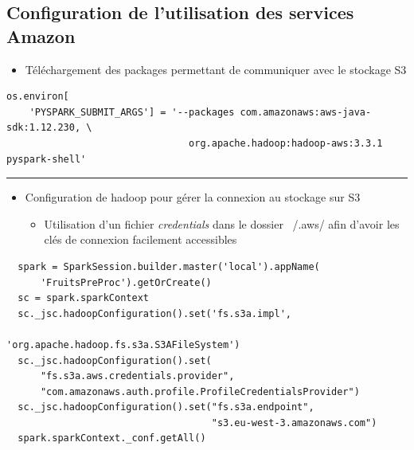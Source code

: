 \documentclass[8pt,aspectratio=169,hyperref={unicode=true}]{beamer}
\begin{document}
\subsection{Configuration de l'utilisation des services Amazon}
\begin{frame}[fragile]{\insertsection}{\insertsubsection}
  \begin{itemize}
    \item Téléchargement des packages permettant de communiquer avec le stockage S3
  \end{itemize}
  \begin{verbatim}
os.environ[
    'PYSPARK_SUBMIT_ARGS'] = '--packages com.amazonaws:aws-java-sdk:1.12.230, \
                                org.apache.hadoop:hadoop-aws:3.3.1 pyspark-shell'
  \end{verbatim}

  \vfill
  \hrule

  \begin{itemize}
    \item Configuration de hadoop pour gérer la connexion au stockage sur S3
    \begin{itemize}
      \item Utilisation d'un fichier \emph{credentials} dans le dossier ~/.aws/ afin d'avoir les clés de connexion facilement accessibles
    \end{itemize}
  \end{itemize}
  \begin{verbatim}
  spark = SparkSession.builder.master('local').appName(
      'FruitsPreProc').getOrCreate()
  sc = spark.sparkContext
  sc._jsc.hadoopConfiguration().set('fs.s3a.impl',
                                    'org.apache.hadoop.fs.s3a.S3AFileSystem')
  sc._jsc.hadoopConfiguration().set(
      "fs.s3a.aws.credentials.provider",
      "com.amazonaws.auth.profile.ProfileCredentialsProvider")
  sc._jsc.hadoopConfiguration().set("fs.s3a.endpoint",
                                    "s3.eu-west-3.amazonaws.com")
  spark.sparkContext._conf.getAll()
    \end{verbatim}
\end{frame}
\end{document}
